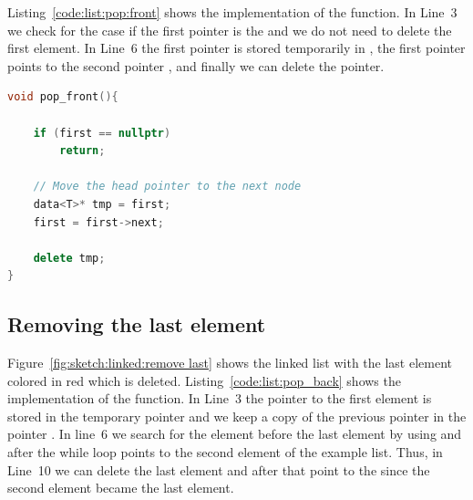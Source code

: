 \documentclass[11pt,fleqn]{book} %
\begin{document}
Listing~\ref{code:list:pop:front} shows the implementation of the  function. In Line~3 we check for the case if the first pointer is the  and we do not need to delete the first element. In Line~6 the first pointer is stored temporarily in , the first pointer points to the second pointer , and finally we can delete the  pointer.


\begin{lstlisting}[language=c++,caption={Implementation of the \cpp{pop_front} function of a linked list.\label{code:list:pop:front}},float,floatplacement=tb]
void pop_front(){
    
    if (first == nullptr) 
        return; 
  
    // Move the head pointer to the next node 
    data<T>* tmp = first; 
    first = first->next; 
  
    delete tmp;   
}
\end{lstlisting}


\subsection*{Removing the last element}
Figure~\ref{fig:sketch:linked:remove last} shows the linked list with the last element colored in \textcolor{amaranth}{red} which is deleted. Listing~\ref{code:list:pop_back} shows the implementation of the  function. In Line~3 the pointer to the first element is stored in the temporary pointer  and we keep a copy of the previous pointer in the pointer . In line~6 we search for the element before the last element by using  and after the while loop  points to the second element of the example list.  Thus, in Line~10 we can delete the last element  and after that point to the  since the second element became the last element.
\end{document}
